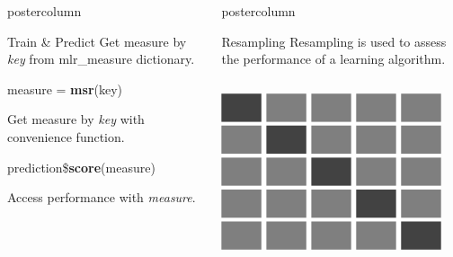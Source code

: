 \documentclass{beamer}
\newlength{\columnheight} %
\begin{document}
\begin{frame}[fragile]{}
\begin{columns}
\begin{column}{.245\textwidth}
\begin{beamercolorbox}[center]{postercolumn}
\begin{minipage}{.98\textwidth}
{\begin{myblock}{Train \& Predict}
					Get measure by \textit{key} from mlr\_measure dictionary.
					\\
					\begin{codebox}
						measure = \textbf{msr}(key)
					\end{codebox}
					Get measure by \textit{key} with convenience function.
					\\
					\begin{codebox}
						prediction\$\textbf{score}(measure)
					\end{codebox}
					Access performance with \textit{measure}.
				\end{myblock}
										}
			\end{minipage}
		\end{beamercolorbox}
	\end{column}
		\begin{column}{.245\textwidth}
		  \begin{beamercolorbox}[center]{postercolumn}
			   \begin{minipage}{.98\textwidth}
				  \parbox[t][\columnheight]{\textwidth}{
					  \begin{myblock}{Resampling}
						  Resampling is used to assess the performance of a learning algorithm.
						  \\[\baselineskip]
						    \begin{minipage}{\textwidth}
							    \begin{columns}[T]
								    \begin{column}{0.2\textwidth}
									    \includegraphics[width=\textwidth]{img/cross_validation.png}
								    \end{column}
								    \begin{column}{0.8\textwidth}

\end{column}
\end{columns}
\end{minipage}
\end{myblock}}
\end{minipage}
\end{beamercolorbox}
\end{column}
\end{columns}
\end{frame}
\end{document}
